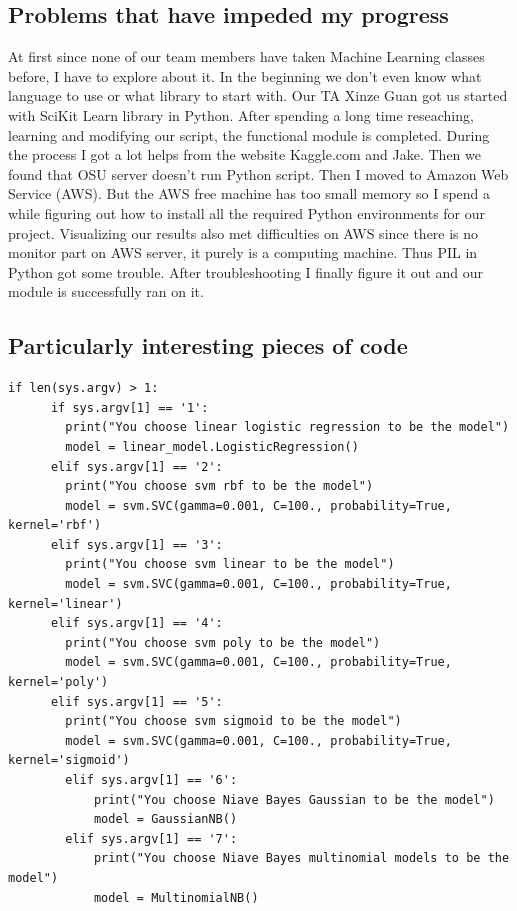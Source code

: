 \documentclass[onecolumn, draftclsnofoot,10pt, compsoc]{IEEEtran}
\begin{document}
\subsection{Problems that have impeded my progress}
At first since none of our team members have taken Machine Learning classes before, I have to explore about it. In the beginning we don't even know what language to use or what library to start with. Our TA Xinze Guan got us started with SciKit Learn library in Python. After spending a long time reseaching, learning and modifying our script, the functional module is completed. During the process I got a lot helps from the website Kaggle.com and Jake. Then we found that OSU server doesn't run Python script. Then I moved to Amazon Web Service (AWS). But the AWS free machine has too small memory so I spend a while figuring out how to install all the required Python environments for our project. 
Visualizing our results also met difficulties on AWS since there is no monitor part on AWS server, it purely is a computing machine. Thus PIL in Python got some trouble. After troubleshooting I finally figure it out and our module is successfully ran on it. 

\subsection{Particularly interesting pieces of code}
\begin{lstlisting}[caption=Python command line arguments that allow users to use different algorithmns from SciKit Learn, label=list2]
if len(sys.argv) > 1:
      if sys.argv[1] == '1':
        print("You choose linear logistic regression to be the model")
        model = linear_model.LogisticRegression()
      elif sys.argv[1] == '2':
        print("You choose svm rbf to be the model")
        model = svm.SVC(gamma=0.001, C=100., probability=True, kernel='rbf')
      elif sys.argv[1] == '3':
        print("You choose svm linear to be the model")
        model = svm.SVC(gamma=0.001, C=100., probability=True, kernel='linear')
      elif sys.argv[1] == '4':
        print("You choose svm poly to be the model")
        model = svm.SVC(gamma=0.001, C=100., probability=True, kernel='poly')
      elif sys.argv[1] == '5':
        print("You choose svm sigmoid to be the model")
        model = svm.SVC(gamma=0.001, C=100., probability=True, kernel='sigmoid')
        elif sys.argv[1] == '6':
            print("You choose Niave Bayes Gaussian to be the model")
            model = GaussianNB()
        elif sys.argv[1] == '7':
            print("You choose Niave Bayes multinomial models to be the model")
            model = MultinomialNB()
\end{lstlisting}
\end{document}
